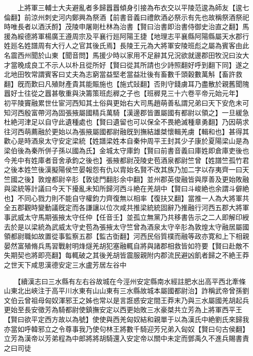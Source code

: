 　　上將軍三輔士大夫避亂者多歸囂囂傾身引接為布衣交以平陵范逡為師友【逡七倫翻】前涼州刺史河内鄭興為祭酒【前書音義曰禮飲酒必祭示有先也故稱祭酒祭祀時唯長者以酒沃酹】茂陵申屠剛杜林為治書【賢曰治書即治書侍御史治直之翻】馬援為綏德將軍楊廣王遵周宗及平襄行廵阿陽王捷【地理志平襄縣阿陽縣屬天水郡行姓廵名姓譜周有大行人之官其後氏焉】長陵王元為大將軍安陵班彪之屬為賓客由此名震西州聞於山東【聞音問】馬援少時以家用不足辭其兄況欲就邊郡田牧況曰汝大才當晚成良工不示人以朴且從所好【賢曰從其所請也少詩照翻好呼到翻下同】遂之北地田牧常謂賓客曰丈夫為志窮當益堅老當益壯後有畜數千頭穀數萬斛【畜許救翻】旣而歎曰凡殖財產貴其能賑施也【施式䜴翻】否則守錢虜耳乃盡散於親舊聞隗囂好士往從之囂甚敬重與決籌策班彪稺之子也【班稺見三十六卷平帝元始元年】　初平陵竇融累世仕宦河西知其土俗與更始右大司馬趙萌善私謂兄弟曰天下安危未可知河西殷富帶河為固張掖屬國精兵萬騎【漢邊郡皆置屬國有都尉以領之】一旦緩急杜絶河津足以自守此遺種處也【賢曰遺留也可以保全不畏絶滅種章勇翻】乃因萌求往河西萌薦融於更始以為張掖屬國都尉融旣到撫結雄桀懷輯羌虜【輯和也】甚得其歡心是時酒泉太守安定梁統【姓譜梁姓本自秦仲周平王封其少子康於夏陽梁山是為梁伯後為秦所併子孫以國為氏】金城太守庫鈞【賢曰前書音義曰庫姓即倉庫吏後也今羌中有姓庫者音舍承鈞之後也】張掖都尉茂陵史苞酒泉都尉竺曾【姓譜竺孤竹君之後本姓竺後漢擬陽侯竺晏報怨有仇以胄始名賢不改其族乃加二字以存夷齊一曰天竺國之後】敦煌都尉辛肜【敦徒門翻肜余中翻】並州郡英俊融皆與厚善及更始敗融與梁統等計議曰今天下擾亂未知所歸河西斗絶在羌胡中【賢曰斗峻絶也余謂斗僻絶也】不同心戮力則不能自守權鈞力齊復無以相率【復扶又翻】當推一人為大將軍共全五郡觀時變動議旣定而各謙讓以位次咸共推梁統統固辭乃推融行河西五郡大將軍事武威太守馬期張掖太守任仲【任音壬】並孤立無黨乃共移書告示之二人即解印綬去於是以梁統為武威太守史苞為張掖太守竺曾為酒泉太守辛肜為敦煌太守融居屬國領都尉職如故置從事監察五郡【監古衘翻】河西民俗質樸而融等政亦寛和上下相親晏然富殖脩兵馬習戰射明烽燧羌胡犯塞融輒自將與諸郡相救皆如符要【賢曰赴敵不失期契也將即亮翻】每輒破之其後羌胡皆震服親附内郡流民避凶飢者歸之不絶王莽之世天下咸思漢德安定三水盧芳居左谷中

　　【續漢志曰三水縣有左右谷故城在今涇州安定縣南水經註肥水出高平西北牽條山東北出峽注于高平川水東有山山東有三水縣故城本屬國都尉治】詐稱武帝曾孫劉文伯云曾祖母匈奴渾邪王之姊也常以是言誑惑安定間王莽末乃與三水屬國羌胡起兵更始至長安徵芳為騎都尉使鎮撫安定以西更始敗三水豪桀共立芳為上將軍西平王【賢曰欲平定西方故以為號】使使與西羌匈奴結和親單于以為漢氏中絶劉氏來歸我亦當如呼韓邪立之令尊事我乃使句林王將數千騎迎芳兄弟入匈奴【賢曰句古侯翻】立芳為漢帝以芳弟程為中郎將將胡騎還入安定帝以關中未定而鄧禹久不進兵賜書責之曰司徒

